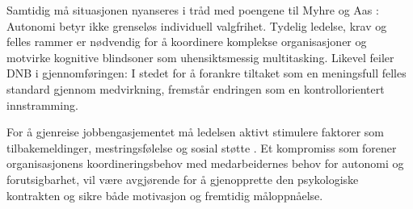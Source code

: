 Samtidig må situasjonen nyanseres i tråd med poengene til Myhre og Aas \parencite{myhre2026}: Autonomi betyr ikke grenseløs individuell valgfrihet. Tydelig ledelse, krav og felles rammer er nødvendig for å koordinere komplekse organisasjoner og motvirke kognitive blindsoner som uhensiktsmessig multitasking. Likevel feiler DNB i gjennomføringen: I stedet for å forankre tiltaket som en meningsfull felles standard gjennom medvirkning, fremstår endringen som en kontrollorientert innstramming.

For å gjenreise jobbengasjementet må ledelsen aktivt stimulere faktorer som tilbakemeldinger, mestringsfølelse og sosial støtte \parencite[s.~152]{einarsen2023}. Et kompromiss som forener organisasjonens koordineringsbehov med medarbeidernes behov for autonomi og forutsigbarhet, vil være avgjørende for å gjenopprette den psykologiske kontrakten og sikre både motivasjon og fremtidig måloppnåelse.
